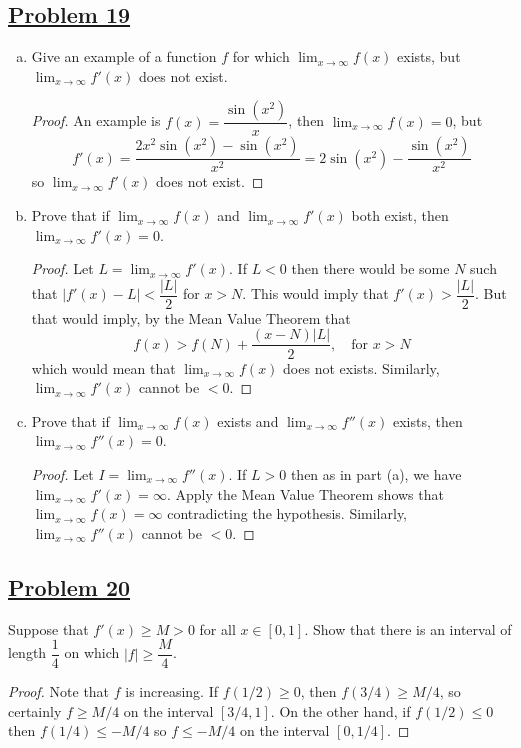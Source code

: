 \documentclass[10pt,letterpaper]{article}
\begin{document}
	\subsection*{{\color{purple}\underline{Problem 19}}}
	\begin{enumerate}[(a)]
	\item Give an example of a function $f$ for which $\displaystyle\lim_{x\to \infty} f(x)$
	exists, but $\displaystyle\lim_{x\to \infty}f'(x)$ does not exist.
\begin{proof}
	An example is $f(x) = \dfrac{\sin(x^2)}{x}$, then $\displaystyle\lim_{x\to \infty}f(x) = 0$, but
	$$f'(x) = \dfrac{2x^2 \sin(x^2) - \sin(x^2)}{x^2}
	= 2\sin(x^2) - \dfrac{\sin(x^2)}{x^2}$$
	so $\displaystyle\lim_{x\to \infty}f'(x)$ does not exist.
\end{proof}	
	
	\item Prove that if $\displaystyle\lim_{x\to \infty}f(x)$ and 
	$\displaystyle\lim_{x\to \infty}f'(x)$ both exist, then $\displaystyle\lim_{x\to \infty}f'(x) = 0$.
\begin{proof}
	Let $L = \displaystyle\lim_{x\to \infty}f'(x)$. If $L < 0$ then there would be some $N$ 
	such that $|f'(x) - L| < \dfrac{|L|}{2}$ for $x > N$. This would imply that $f'(x) > \dfrac{|L|}{2}$.
	But that would imply, by the Mean Value Theorem that
	$$f(x) > f(N) + \dfrac{(x - N)|L|}{2} , \, \, \, \, \text{ for } x > N$$
	which would mean that $\displaystyle\lim_{x\to \infty}f(x)$ does not exists. Similarly,
	$\displaystyle\lim_{x\to \infty}f'(x)$ cannot be $< 0$.
\end{proof}
	
	\item Prove that if $\displaystyle\lim_{x\to \infty}f(x)$ exists and 
	$\displaystyle\lim_{x\to \infty}f''(x)$ exists, then $\displaystyle\lim_{x\to \infty}f''(x) = 0$.
	\begin{proof}
		Let $I = \displaystyle\lim_{x\to \infty}f''(x)$. If $L > 0$ then as in part (a),
		we have $\displaystyle\lim_{x\to \infty}f'(x) = \infty$. Apply the Mean Value
		Theorem shows that $\displaystyle\lim_{x\to \infty} f(x) = \infty$ contradicting
		the hypothesis. Similarly, $\displaystyle\lim_{x\to \infty}f''(x)$ cannot be $< 0$.
	\end{proof}
	\end{enumerate}
	
	\subsection*{{\color{purple}\underline{Problem 20}}}
	Suppose that $f'(x) \geq M > 0$ for all $x \in [0, 1]$. Show that there is an interval
	of length $\dfrac{1}{4}$ on which $|f| \geq \dfrac{M}{4}$.
	\begin{proof}
	Note that $f$ is increasing. If $f(1/2) \geq 0$, then $f(3/4) \geq M/4$, so certainly
	$f \geq M/4$ on the interval $[3/4, 1]$. On the other hand, if $f(1/2) \leq 0$ then 
	$f(1/4) \leq -M/4$ so $f \leq -M/4$ on the interval $[0, 1/4]$.		
	\end{proof}
	
\end{document}
